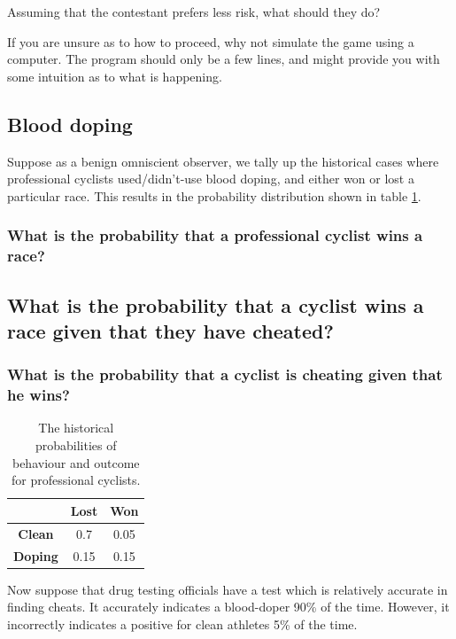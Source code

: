 \documentclass[11pt,fullpage]{book}
\begin{document}
Assuming that the contestant prefers less risk, what should they do?

If you are unsure as to how to proceed, why not simulate the game using a computer. The program should only be a few lines, and might provide you with some intuition as to what is happening.

\subsection{Blood doping}
Suppose as a benign omniscient observer, we tally up the historical cases where professional cyclists used/didn't-use blood doping, and either won or lost a particular race. This results in the probability distribution shown in table \ref{tab:Probability_PS_bloodDoping}.

\subsubsection{What is the probability that a professional cyclist wins a race?}
\subsection{What is the probability that a cyclist wins a race given that they have cheated?}
\subsubsection{What is the probability that a cyclist is cheating given that he wins?}

\begin{table}[htbp]
  \centering
    \begin{tabular}{ccc}
    \toprule
          & \textbf{Lost} & \textbf{Won} \\
    \midrule
    \textbf{Clean} & 0.7   & 0.05 \\
    \textbf{Doping} & 0.15  & 0.15 \\
    \bottomrule
    \end{tabular}%
    \caption{The historical probabilities of behaviour and outcome for professional cyclists.}
  \label{tab:Probability_PS_bloodDoping}%
\end{table}%

Now suppose that drug testing officials have a test which is relatively accurate in finding cheats. It accurately indicates a blood-doper 90\% of the time. However, it incorrectly indicates a positive for clean athletes 5\% of the time. 
\end{document}

